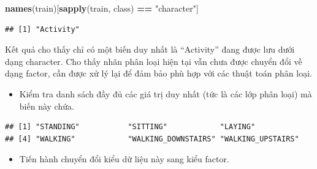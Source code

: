 \documentclass[
]{article}
\newenvironment{Shaded}{\begin{snugshade}}{\end{snugshade}}
\newcommand{\FunctionTok}[1]{\textcolor[rgb]{0.13,0.29,0.53}{\textbf{#1}}}
\newcommand{\NormalTok}[1]{#1}
\newcommand{\OtherTok}[1]{\textcolor[rgb]{0.56,0.35,0.01}{#1}}
\newcommand{\SpecialCharTok}[1]{\textcolor[rgb]{0.81,0.36,0.00}{\textbf{#1}}}
\newcommand{\StringTok}[1]{\textcolor[rgb]{0.31,0.60,0.02}{#1}}
\providecommand{\tightlist}{%
  \setlength{\itemsep}{0pt}\setlength{\parskip}{0pt}}
\begin{document}
\begin{Shaded}
\begin{Highlighting}[]
\FunctionTok{names}\NormalTok{(train)[}\FunctionTok{sapply}\NormalTok{(train, class) }\SpecialCharTok{==} \StringTok{"character"}\NormalTok{]}
\end{Highlighting}
\end{Shaded}

\begin{verbatim}
## [1] "Activity"
\end{verbatim}

Kết quả cho thấy chỉ có một biến duy nhất là ``Activity'' đang được lưu
dưới dạng character. Cho thấy nhãn phân loại hiện tại vẫn chưa được
chuyển đổi về dạng factor, cần được xử lý lại để đảm bảo phù hợp với các
thuật toán phân loại.

\begin{itemize}
\tightlist
\item
  Kiểm tra danh sách đầy đủ các giá trị duy nhất (tức là các lớp phân
  loại) mà biến này chứa.
\end{itemize}

\begin{Shaded}
\end{Shaded}

\begin{verbatim}
## [1] "STANDING"           "SITTING"            "LAYING"            
## [4] "WALKING"            "WALKING_DOWNSTAIRS" "WALKING_UPSTAIRS"
\end{verbatim}

\begin{itemize}
\tightlist
\item
  Tiến hành chuyển đổi kiểu dữ liệu này sang kiểu factor.
\end{itemize}

\begin{Shaded}
\end{Shaded}
\end{document}
